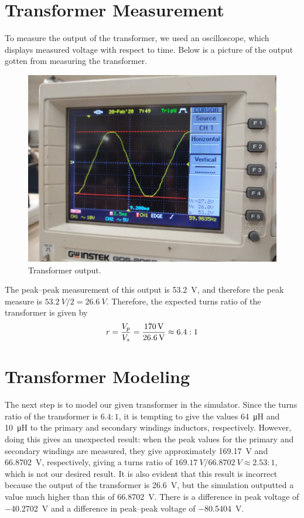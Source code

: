 \documentclass{article}
\begin{document}
\section{Transformer Measurement} To measure the output of
the transformer, we used an oscilloscope, which displays measured
voltage with respect to time. Below is a picture of the
output gotten from measuring the transformer.

\begin{figure}[h]
    \centering
    \includegraphics[width=\textwidth]{Images/20200220_182510.jpg}
    \caption{Transformer output.}
    \label{fig2}
\end{figure}

The peak--peak measurement of this output is \SI{53.2}{V},
and therefore the peak measure is \(\SI{53.2}{V} / 2 =
\SI{26.6}{V}\). Therefore, the
expected turns ratio of the transformer
is given by
\begin{equation*}
    r = {V_p \over V_s} = {\SI{170}{V} \over \SI{26.6}{V}}
    \approx 6.4:1
\end{equation*}

\section{Transformer Modeling} The next step is to model
our given transformer in the simulator. Since the turns
ratio of the transformer is \(6.4:1\), it is tempting to
give the values \SI{64}{\micro H} and \SI{10}{\micro H} to
the primary and secondary windings inductors, respectively.
However, doing this gives an unexpected result: when the
peak values for the primary and secondary windings are
measured, they give approximately \SI{169.17}{V} and \SI{66.8702}{V},
respectively, giving a turns ratio of
\(\SI{169.17}{V} / \SI{66.8702}{V} \approx 2.53:1\), which is
not our desired result. It is also evident that this result
is incorrect because the output of the transformer is \SI{26.6}{V},
but the simulation outputted a value much higher than this
of \SI{66.8702}{V}.
There is a difference in peak voltage of \SI{-40.2702}{V} and
a difference in peak--peak voltage of \SI{-80.5404}{V}.
\end{document}
